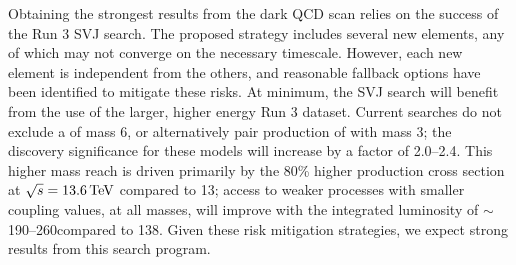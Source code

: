 Obtaining the strongest results from the dark QCD scan relies on the success of the Run 3 SVJ search.
The proposed strategy includes several new elements, any of which may not converge on the necessary timescale.
However, each new element is independent from the others, and reasonable fallback options have been identified to mitigate these risks.
At minimum, the SVJ search will benefit from the use of the larger, higher energy Run 3 dataset.
Current searches do not exclude a \PZprime of mass 6\TeV, or alternatively pair production of \Pbifun with mass 3\TeV;
the discovery significance for these models will increase by a factor of 2.0--2.4.
This higher mass reach is driven primarily by the 80\% higher production cross section at $\sqrt{s}=13.6\,\text{Te\hspace{-.08em}V}$ compared to 13\TeV;
access to weaker processes with smaller coupling values, at all masses, will improve with the integrated luminosity of ${\sim}$190--260\fbinv compared to 138\fbinv.
Given these risk mitigation strategies, we expect strong results from this search program.
